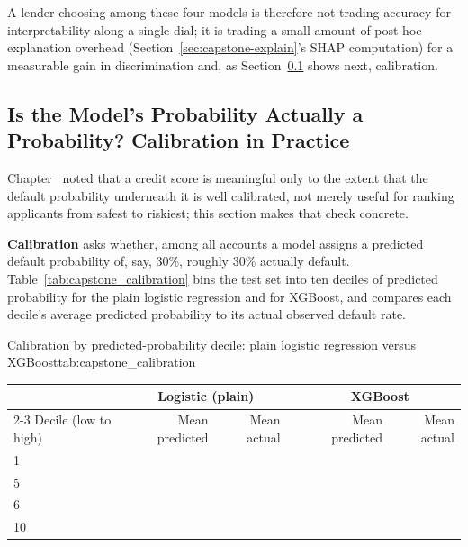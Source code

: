 \documentclass[../ai_in_finance]{subfiles}
\begin{document}
A lender choosing among these four models is therefore not trading accuracy for interpretability along a single dial; it is trading a small amount of post-hoc explanation overhead (Section~\ref{sec:capstone-explain}'s SHAP computation) for a measurable gain in discrimination and, as Section~\ref{sec:capstone-calibration} shows next, calibration.

\subsection{Is the Model's Probability Actually a Probability? Calibration in Practice}
\label{sec:capstone-calibration}

Chapter~ noted that a credit score is meaningful only to the extent that the default probability underneath it is well calibrated, not merely useful for ranking applicants from safest to riskiest; this section makes that check concrete.

\textbf{Calibration} asks whether, among all accounts a model assigns a predicted default probability of, say, 30\%, roughly 30\% actually default. Table~\ref{tab:capstone_calibration} bins the test set into ten deciles of predicted probability for the plain logistic regression and for XGBoost, and compares each decile's average predicted probability to its actual observed default rate.

\begin{booktable}[htbp]{Calibration by predicted-probability decile: plain logistic regression versus XGBoost}{tab:capstone_calibration}
\small
\begin{tabular}{lrrrrr}
\toprule
& \multicolumn{2}{c}{Logistic (plain)} & & \multicolumn{2}{c}{XGBoost} \\
\cmidrule{2-3} \cmidrule{5-6}
Decile (low to high) & Mean predicted & Mean actual & & Mean predicted & Mean actual \\
\midrule
1 & \vChTwentyOneCalLRPredA{} & \vChTwentyOneCalLRActA{} & & \vChTwentyOneCalXGBPredA{} & \vChTwentyOneCalXGBActA{} \\
5 & \vChTwentyOneCalLRPredE{} & \vChTwentyOneCalLRActE{} & & \vChTwentyOneCalXGBPredE{} & \vChTwentyOneCalXGBActE{} \\
6 & \vChTwentyOneCalLRPredF{} & \vChTwentyOneCalLRActF{} & & \vChTwentyOneCalXGBPredF{} & \vChTwentyOneCalXGBActF{} \\
10 & \vChTwentyOneCalLRPredJ{} & \vChTwentyOneCalLRActJ{} & & \vChTwentyOneCalXGBPredJ{} & \vChTwentyOneCalXGBActJ{} \\
\bottomrule
\end{tabular}
\end{booktable}
\end{document}
